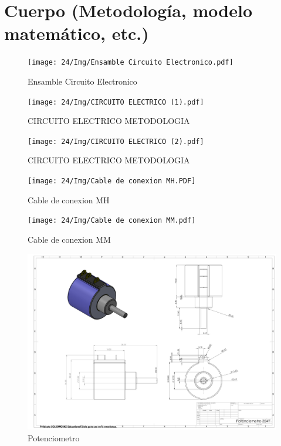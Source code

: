     \section{Cuerpo (Metodología, modelo matemático, etc.)}
    \begin{figure}[H]
        \centering
        \texttt{[image: 24/Img/Ensamble Circuito Electronico.pdf]}
        \caption{Ensamble Circuito Electronico}
        \label{fig:Ensamble Circuito Electronico}
    \end{figure}
    \begin{figure}[H]
        \centering
        \texttt{[image: 24/Img/CIRCUITO ELECTRICO (1).pdf]}
        \caption{CIRCUITO ELECTRICO METODOLOGIA}
        \label{fig:CIRCUITO ELECTRICO }
    \end{figure}
    \begin{figure}[H]
        \centering
        \texttt{[image: 24/Img/CIRCUITO ELECTRICO (2).pdf]}
        \caption{CIRCUITO ELECTRICO METODOLOGIA}
        \label{fig:CIRCUITO ELECTRICO }
    \end{figure}
    \begin{figure}[H]
        \centering
        \texttt{[image: 24/Img/Cable de conexion MH.PDF]}
        \caption{Cable de conexion MH}
        \label{fig:Cable de conexion MH}
    \end{figure}
    \begin{figure}[H]
        \centering
        \texttt{[image: 24/Img/Cable de conexion MM.pdf]}
        \caption{Cable de conexion MM}
        \label{fig:Cable de conexion MM}
    \end{figure}
    \begin{figure}[H]
        \centering
        \includegraphics[trim = {10mm 10mm 10mm 10mm},clip,scale=0.120]{24/Img/Potenciometro.pdf}
        \caption{Potenciometro}
        \label{fig:Potenciometro}
    \end{figure}
